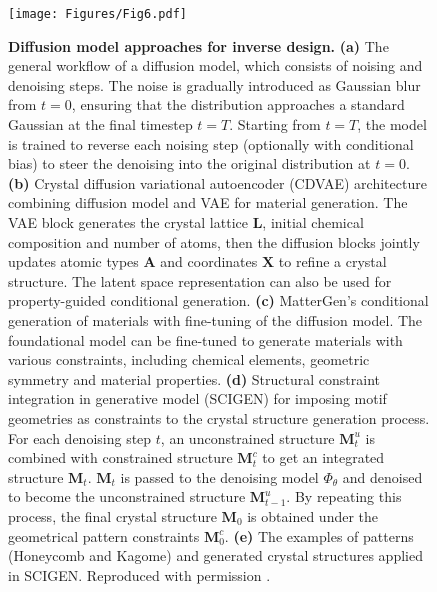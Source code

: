 \documentclass[fleqn,10pt]{wlscirep}
\begin{document}
\begin{figure}[!htbp]
    \centering
    \texttt{[image: Figures/Fig6.pdf]}
    \caption{\textbf{Diffusion model approaches for inverse design.} \textbf{(a)} The general workflow of a diffusion model, which consists of noising and denoising steps. The noise is gradually introduced as Gaussian blur from $t=0$, ensuring that the distribution approaches a standard Gaussian at the final timestep $t=T$. Starting from $t=T$, the model is trained to reverse each noising step (optionally with conditional bias) to steer the denoising into the original distribution at $t=0$. \textbf{(b)} Crystal diffusion variational autoencoder (CDVAE) architecture combining diffusion model and VAE for material generation\cite{xie2021crystal}. The VAE block generates the crystal lattice $\mathbf{L}$, initial chemical composition and number of atoms, then the diffusion blocks jointly updates atomic types $\mathbf{A}$ and coordinates $\mathbf{X}$ to refine a crystal structure. The latent space representation can also be used for property-guided conditional generation. \textbf{(c)} MatterGen's conditional generation of materials with fine-tuning of the diffusion model\cite{zeni2025generative}. The foundational model can be fine-tuned to generate materials with various constraints, including chemical elements, geometric symmetry and material properties. \textbf{(d)} Structural constraint integration in generative model (SCIGEN) for imposing motif geometries as constraints to the crystal structure generation process\cite{okabe2024structural}.
    For each denoising step $t$, an unconstrained structure $\boldsymbol{M}_{t}^u$ is combined with constrained structure $\boldsymbol{M}_{t}^c$ to get an integrated structure $\boldsymbol{M}_{t}$. $\boldsymbol{M}_{t}$ is passed to the denoising model $\Phi_{\theta}$ and denoised to become the unconstrained structure $\boldsymbol{M}_{t-1}^u$. By repeating this process, the final crystal structure $\boldsymbol{M}_{0}$ is obtained under the geometrical pattern constraints $\boldsymbol{M}_{0}^c$.
    \textbf{(e)} The examples of patterns (Honeycomb and Kagome) and generated crystal structures applied in SCIGEN. Reproduced with permission \cite{xie2021crystal,zeni2025generative,okabe2024structural}.}
    \label{fig6}
\end{figure}
\end{document}
